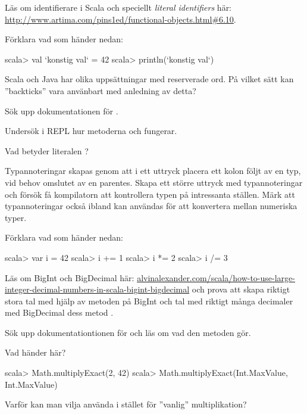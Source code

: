 {{\Task Läs om identifierare i Scala och speciellt \emph{literal identifiers} här: \url{http://www.artima.com/pins1ed/functional-objects.html#6.10}.

\Subtask Förklara vad som händer nedan:
\begin{REPLnonum}
scala> val `konstig val` = 42
scala> println(`konstig val`)
\end{REPLnonum}

\Subtask Scala och Java har olika uppsättningar med reserverade ord. På vilket sätt kan ''backticks'' vara använbart med anledning av detta?


\Task Sök upp dokumentationen för .

\Subtask Undersök i REPL hur metoderna  och  fungerar.

\Subtask Vad betyder literalen ?

\Task Typannoteringar skapas genom att i ett uttryck placera ett kolon följt av en typ, vid behov  omslutet av en parentes. Skapa ett större uttryck med typannoteringar och försök få kompilatorn att kontrollera typen på intressanta ställen. Märk att typannoteringar också ibland kan användas för att konvertera mellan numeriska typer.


\Task Förklara vad som händer nedan:
\begin{REPL}
scala> var i = 42
scala> i += 1
scala> i *= 2
scala> i /= 3
\end{REPL}


\Task Läs om BigInt och BigDecimal här: \href{http://alvinalexander.com/scala/how-to-use-large-integer-decimal-numbers-in-scala-bigint-bigdecimal}{alvinalexander.com/scala/how-to-use-large-integer-decimal-numbers-in-scala-bigint-bigdecimal} och prova att skapa riktigt stora tal med hjälp av metoden  på BigInt och tal med riktigt många decimaler med BigDecimal dess metod .

\Task Sök upp dokumentationtionen för  och läs om vad den metoden gör.

\Subtask Vad händer här?
\begin{REPLnonum}
scala> Math.multiplyExact(2, 42)
scala> Math.multiplyExact(Int.MaxValue, Int.MaxValue)
\end{REPLnonum}

\Subtask\Pen Varför kan man vilja använda  i stället för ''vanlig'' multiplikation?



}}
